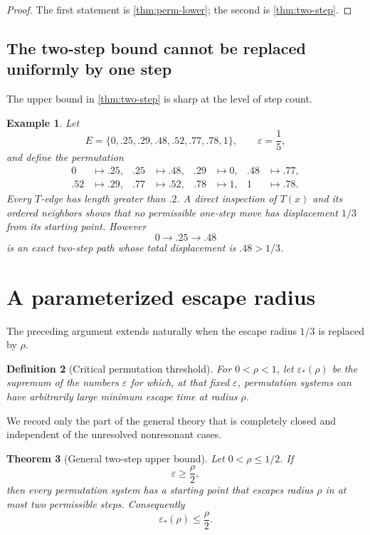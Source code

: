 \documentclass[11pt]{article}
\newtheorem{theorem}{Theorem}[section]
\newtheorem{definition}[theorem]{Definition}
\newtheorem{example}[theorem]{Example}
\newcommand{\eps}{\varepsilon}
\begin{document}
\begin{proof}
The first statement is \cref{thm:perm-lower}; the second is \cref{thm:two-step}.
\end{proof}

\subsection{The two-step bound cannot be replaced uniformly by one step}

The upper bound in \cref{thm:two-step} is sharp at the level of step count.

\begin{example}\label{ex:two-steps-sharp}
Let
\[
E=\{0,.25,.29,.48,.52,.77,.78,1\},
\qquad \eps=\frac15,
\]
and define the permutation
\[
\begin{aligned}
0&\mapsto .25,& .25&\mapsto .48,& .29&\mapsto0,& .48&\mapsto .77,\\
.52&\mapsto .29,& .77&\mapsto .52,& .78&\mapsto1,& 1&\mapsto .78.
\end{aligned}
\]
Every $T$-edge has length greater than $.2$. A direct inspection of $T(x)$ and its ordered neighbors shows that no permissible one-step move has displacement $1/3$ from its starting point. However
\[
0\to .25\to .48
\]
is an exact two-step path whose total displacement is $.48>1/3$.
\end{example}

\section{A parameterized escape radius}

The preceding argument extends naturally when the escape radius $1/3$ is replaced by $\rho$.

\begin{definition}[Critical permutation threshold]\label{def:epsstar}
For $0<\rho<1$, let $\eps_*(\rho)$ be the supremum of the numbers $\eps$ for which, at that fixed $\eps$, permutation systems can have arbitrarily large minimum escape time at radius $\rho$.
\end{definition}

We record only the part of the general theory that is completely closed and independent of the unresolved nonresonant cases.

\begin{theorem}[General two-step upper bound]\label{thm:rho-upper}
Let $0<\rho\le1/2$. If
\[
\eps\ge\frac\rho2,
\]
then every permutation system has a starting point that escapes radius $\rho$ in at most two permissible steps. Consequently
\[
\boxed{\eps_*(\rho)\le\frac\rho2.}
\]
\end{theorem}
\end{document}
